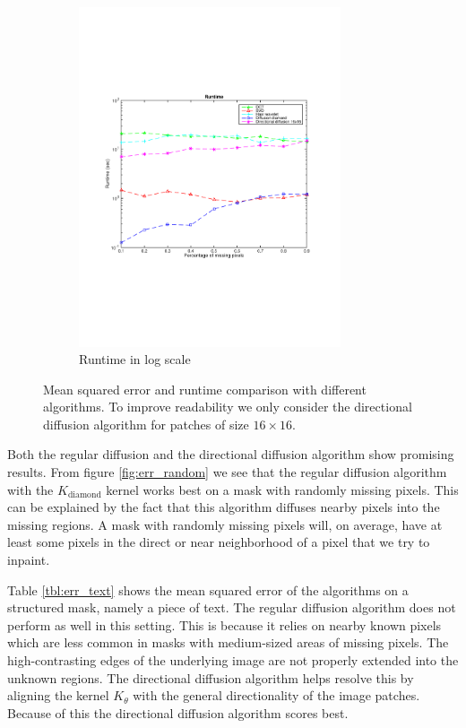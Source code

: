 \begin{figure}
\begin{subfigure}[b]{0.49\textwidth}
		\includegraphics[clip, trim=2cm 7cm 2cm 6cm, width=0.85\textwidth]{figures/runtime_vector}
		\caption{Runtime in log scale}
		\label{fig:runtime}
	\end{subfigure}
	
	\caption{Mean squared error and runtime comparison with different algorithms. To improve readability we only consider the directional diffusion algorithm for patches of size $16 \times 16$.}
	\label{fig:rmd_results}
\end{figure}


Both the regular diffusion and the directional diffusion algorithm show promising results. From figure \ref{fig:err_random} we see that the regular diffusion algorithm with the $K_{\text{diamond}}$ kernel works best on a mask with randomly missing pixels. This can be explained by the fact that this algorithm diffuses nearby pixels into the missing regions. A mask with randomly missing pixels will, on average, have at least some pixels in the direct or near neighborhood of a pixel that we try to inpaint.

Table \ref{tbl:err_text} shows the mean squared error of the algorithms on a structured mask, namely a piece of text. The regular diffusion algorithm does not perform as well in this setting. This is because it relies on nearby known pixels which are less common in masks with medium-sized areas of missing pixels. The high-contrasting edges of the underlying image are not properly extended into the unknown regions. The directional diffusion algorithm helps resolve this by aligning the kernel  $K_{\theta}$ with the general directionality of the image patches. Because of this the directional diffusion algorithm scores best.

